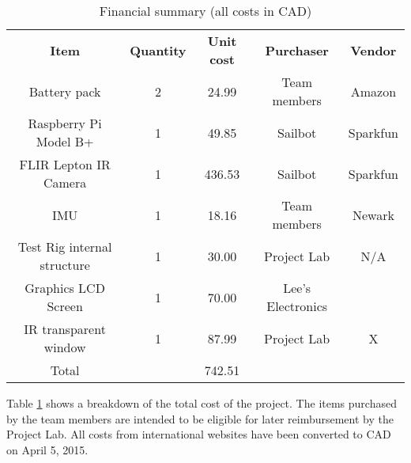 
\begin{table}
\caption[Financial summary]{\label{tab:financialsummary}Financial summary (all costs in CAD)}
\begin{tabular}{c|c|c|c|c}
\textbf{Item} & \textbf{Quantity} & \textbf{Unit cost} & \textbf{Purchaser} & \textbf{Vendor}\\
Battery pack & 2 & 24.99 & Team members & Amazon\\
Raspberry Pi Model B+ & 1 & 49.85 & Sailbot & Sparkfun\\
FLIR Lepton IR Camera & 1 & 436.53 & Sailbot & Sparkfun\\
IMU & 1 & 18.16 & Team members & Newark\\
Test Rig internal structure & 1 & 30.00 & Project Lab & N/A\\
Graphics LCD Screen & 1 & 70.00 & Lee's Electronics\\
IR transparent window & 1 & 87.99 & Project Lab & X\\\hline
Total & & 742.51 & & \\

\end{tabular}
\end{table}

Table \ref{tab:financialsummary} shows a breakdown of the total cost of the project. The items purchased by the team members are intended to be eligible for later reimbursement by the Project Lab. All costs from international websites have been converted to CAD on April 5, 2015.
